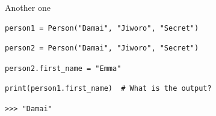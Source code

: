 \begin{frame}[fragile]{Another one}
\begin{verbatim}
person1 = Person("Damai", "Jiworo", "Secret")
\end{verbatim}
\pause
\begin{verbatim}
person2 = Person("Damai", "Jiworo", "Secret")
\end{verbatim} 
\pause
\begin{verbatim}
person2.first_name = "Emma"
\end{verbatim}
\pause
\begin{verbatim}
print(person1.first_name)  # What is the output?
\end{verbatim}
\pause
\begin{verbatim}
>>> "Damai"
\end{verbatim}
\end{frame}